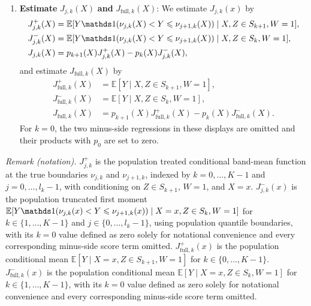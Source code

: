 \begin{enumerate}
Then, we estimate the conditional expectations of the indicators within the moment constraints:
\begin{align*}
    M_{j,k}^{+}(X) &\coloneqq \mathbb{E}\left[\indicator(Y \leqslant \nu_{j,k}(X)) \mathrel{|} Z \in S_{k+1}, W=1,  X \right], \\
    M_{j,k}^{-}(X) &\coloneqq \mathbb{E}\left[\indicator(Y \leqslant \nu_{j,k}(X)) \mathrel{|} Z \in S_{k}, W=1,  X \right].
\end{align*}
The minus-side regression is estimated only for $k\geqslant1$; at $k=0$ it is omitted under the structural-boundary convention.

    \item \textbf{Estimate} $J_{j,k}(X)$ \textbf{and} $J_{\text{full},k}(X)$: We estimate $J_{j,k}(x)$ by
\begin{align*}
J_{j,k}^{+}(X) & =\mathbb{E}[ Y\indicator( \nu _{j,k}( X) < Y \leqslant \nu _{j+1,k}( X)) \mid X,Z\in S_{k+1} ,W=1],\\
J_{j,k}^{-}(X) & =\mathbb{E}[ Y\indicator( \nu _{j,k}( X) < Y \leqslant \nu _{j+1,k}( X)) \mid X,Z\in S_{k} ,W=1] ,\\
J_{j,k}(X) & = p_{k+1}( X)J_{j,k}^{+}(X) - p_{k}( X)J_{j,k}^{-}(X),
\end{align*}
and estimate $ J_{\text{full} ,k} (X) $ by
\begin{align*}
J_{\text{full} ,k}^{+} (X) & =\mathbb{E}[ Y\mid X,Z\in S_{k+1} ,W=1]  ,\\
J_{\text{full} ,k}^{-} (X) & =\mathbb{E}[ Y\mid X,Z\in S_{k} ,W=1] ,\\
J_{\text{full} ,k} (X) & = p_{k+1}( X)J_{\text{full} ,k}^{+} (X)-  p_{k}( X)J_{\text{full} ,k}^{-} (X).
\end{align*}
For $k=0$, the two minus-side regressions in these displays are omitted and their products with $p_0$ are set to zero.
\end{enumerate}

\noindent\textit{Remark (notation).} $J_{j,k}^{+}$ is the population treated conditional band-mean function at the true boundaries $\nu_{j,k}$ and $\nu_{j+1,k}$, indexed by $k=0,\ldots,K-1$ and $j=0,\ldots,l_k-1$, with conditioning on $Z\in S_{k+1}$, $W=1$, and $X=x$. $J_{j,k}^{-}(x)$ is the population truncated first moment $\mathbb E[Y\indicator(\nu_{j,k}(x)<Y\leqslant\nu_{j+1,k}(x))\mid X=x,Z\in S_k,W=1]$ for $k\in\{1,\ldots,K-1\}$ and $j\in\{0,\ldots,l_k-1\}$, using population quantile boundaries, with its $k=0$ value defined as zero solely for notational convenience and every corresponding minus-side score term omitted. $J_{\text{full},k}^{+}(x)$ is the population conditional mean $\mathbb E[Y\mid X=x,Z\in S_{k+1},W=1]$ for $k\in\{0,\ldots,K-1\}$. $J_{\text{full},k}^{-}(x)$ is the population conditional mean $\mathbb E[Y\mid X=x,Z\in S_k,W=1]$ for $k\in\{1,\ldots,K-1\}$, with its $k=0$ value defined as zero solely for notational convenience and every corresponding minus-side score term omitted.


